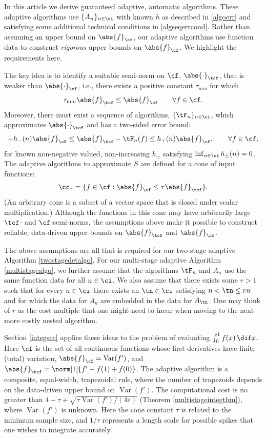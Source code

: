 \documentclass[]{elsarticle}
\DeclareMathOperator{\Var}{Var}
\theoremstyle{definition}
\theoremstyle{remark}
\newcommand{\Fnorm}[1]{\abs{#1}_{\cf}}
\newcommand{\Ftnorm}[1]{\abs{#1}_{\tcf}}
\begin{document}
In this article we derive guaranteed adaptive, automatic algorithms.  These adaptive algorithms use $\{A_n\}_{n \in \ci}$ with known $h$ as described in \eqref{algoerr} and satisfying some additional technical conditions in \eqref{algseqerrcond}.  Rather than assuming an upper bound on $\Fnorm{f}$, our adaptive algorithms use function data to construct \emph{rigorous} upper bounds on $\Fnorm{f}$.  We highlight the requirements here.

The key idea is to identify a suitable semi-norm on $\cf$, $\Ftnorm{\cdot}$, that is weaker than $\Fnorm{\cdot}$, i.e., there exists a positive constant $\tau_{\min}$ for which 
\begin{equation} \label{Fspacecondstrong}
\tau_{\min} \Ftnorm{f} \le \Fnorm{f} \qquad \forall f \in \cf.
\end{equation}
Moreover, there must exist a sequence of algorithms, $\{\tF_n\}_{n\in \ci}$, which approximates $\Ftnorm{\cdot}$ and has a two-sided error bound:
\begin{equation} \label{Gerrbds}
-h_{-}(n)\Fnorm{f} \le \Ftnorm{f}- \tF_n(f) \le h_{+}(n) \Fnorm{f}, \qquad \forall f \in \cf,
\end{equation}
for known non-negative valued, non-increasing $h_{\pm}$ satisfying $\inf_{n \in \ci} h_{\pm}(n) = 0$.  The adaptive algorithms to approximate $S$ are defined for a cone of input functions:
\begin{equation} \label{conedef}
\cc_{\tau}=\{f \in \cf : \Fnorm{f} \le \tau \Ftnorm{f} \}.
\end{equation}
(An arbitrary cone is a subset of a vector space that is closed under scalar multiplication.) Although the functions in this cone may have arbitrarily large $\tcf$- and $\cf$-semi-norms, the assumptions above make it
possible to construct reliable, data-driven upper bounds on $\Ftnorm{f}$ and $\Fnorm{f}$. 

The above assumptions are all that is required for our two-stage adaptive Algorithm \ref{twostagedetalgo}.  For our multi-stage adaptive Algorithm \ref{multistagealgo}, we further assume that the algorithms $\tF_n$ and $A_n$ use the same function data for all $n \in \ci$.  We also assume that there exists some $r>1$ such that for every $n \in \ci$ there exists an $\tn \in \ci$ satisfying $n < \tn \le rn$ and for which the data for $A_n$ are embedded in the data for $A_{\tn}$. One may think of $r$ as the cost multiple that one might need to incur when moving to the next more costly nested algorithm.

Section \ref{integsec} applies these ideas to the problem of evaluating $\int_0^1 f(x) \, \dif x$.  Here $\cf$ is the set of all continuous functions whose first derivatives have finite (total) variation, $\Fnorm{f}=\Var(f')$, and $\Ftnorm{f}=\norm[1]{f'-f(1)+f(0)}$.  The adaptive algorithm is a composite, equal-width, trapezoidal rule, where the number of trapezoids depends on the data-driven upper bound on $\Var(f')$.  The computational cost is no greater than $4+ \tau + \sqrt{\tau \Var(f')/(4\varepsilon)}$ (Theorem \ref{multistageintegthm}), where $\Var(f')$ is unknown. Here the cone constant $\tau$ is related to the minimum sample size, and $1/\tau$ represents a length scale for possible spikes that one wishes to integrate accurately.
\end{document}
